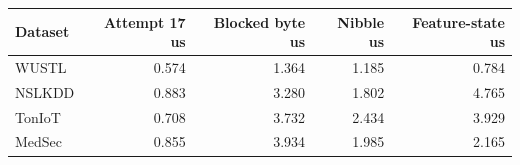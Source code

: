 \begin{tabular}{lrrrr}
\toprule
Dataset & Attempt 17 us & Blocked byte us & Nibble us & Feature-state us \\
\midrule
WUSTL & 0.574 & 1.364 & 1.185 & 0.784 \\
NSLKDD & 0.883 & 3.280 & 1.802 & 4.765 \\
TonIoT & 0.708 & 3.732 & 2.434 & 3.929 \\
MedSec & 0.855 & 3.934 & 1.985 & 2.165 \\
\bottomrule
\end{tabular}
